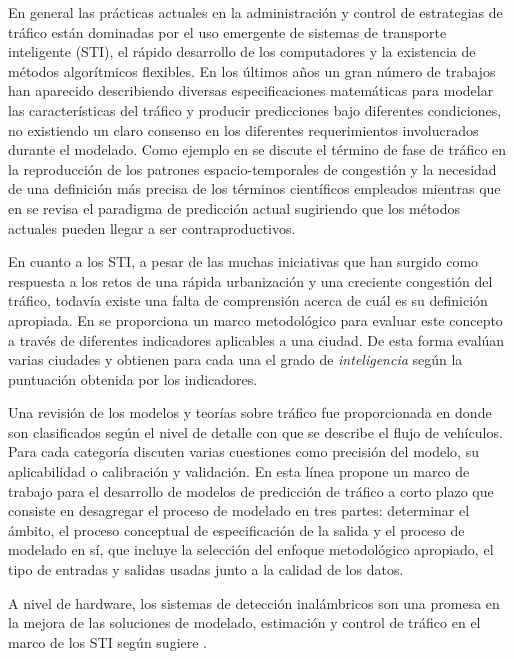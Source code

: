 \documentclass{llncs}
\begin{document}
En general las prácticas actuales en la administración y control de estrategias de tráfico están dominadas por el uso emergente de sistemas de transporte inteligente (STI), el rápido desarrollo de los computadores y la existencia de métodos algorítmicos flexibles. En los últimos años un gran número de trabajos han aparecido describiendo diversas especificaciones matemáticas para modelar las características del tráfico y producir predicciones bajo diferentes condiciones, no existiendo un claro consenso en los diferentes requerimientos involucrados durante el modelado.  Como ejemplo en \cite{Treiber2010983} se discute el término de fase de tráfico en la reproducción de los patrones espacio-temporales de congestión y la necesidad de una definición más precisa de los términos científicos empleados mientras que en \cite{boyce2002sequential} se revisa el paradigma de predicción actual sugiriendo que los métodos actuales pueden llegar a ser contraproductivos.

En cuanto a los STI, a pesar de las muchas iniciativas que han surgido como respuesta a los retos de una rápida urbanización y una creciente congestión del tráfico, todavía existe una falta de comprensión acerca de cuál es su definición apropiada. En \cite{Debnath201447} se proporciona un marco metodológico para evaluar este concepto a través de diferentes indicadores aplicables a una ciudad. De esta forma evalúan varias ciudades y obtienen para cada una el grado de \emph{inteligencia} según la puntuación obtenida por los indicadores.

Una revisión de los modelos y teorías sobre tráfico fue proporcionada en \cite{Hoogendoorn2001283} donde son clasificados según el nivel de detalle con que se describe el flujo de vehículos. Para cada categoría discuten varias cuestiones como precisión del modelo, su aplicabilidad o calibración y validación.  En esta línea \cite{Vlahogianni2004533} propone un marco de trabajo para el desarrollo de modelos de predicción de tráfico a corto plazo que consiste en desagregar el proceso de modelado en tres partes: determinar el ámbito, el proceso conceptual de especificación de la salida y el proceso de modelado en sí, que incluye la selección del enfoque metodológico apropiado, el tipo de entradas y salidas usadas junto a la calidad de los datos.

A nivel de hardware, los sistemas de detección inalámbricos son una promesa en la mejora de las soluciones de modelado, estimación y control de tráfico en el marco de los STI según sugiere \cite{tubaishat2009wireless}.
\end{document}
